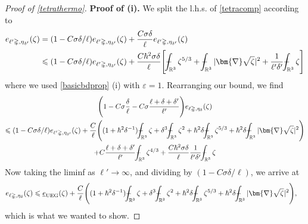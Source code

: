 \documentclass[final,onefignum,onetabnum,reqno]{amsart}
\theoremstyle{remark}
\renewcommand{\le}{\leqslant}
\renewcommand{\epsilon}{\varepsilon}
\newcommand{\ul}[1]{\underline{#1}}
\newcommand{\RR}{\mathbb{R}}
\newcommand{\UEG}{\mathrm{UEG}} %
\newcommand{\grad}{\bm{\nabla}} %
\newcommand{\tetra}{\mathbb{\Delta}} %
\def\Xint#1{\mathchoice
{\XXint\displaystyle\textstyle{#1}}%
{\XXint\textstyle\scriptstyle{#1}}%
{\XXint\scriptstyle\scriptscriptstyle{#1}}%
{\XXint\scriptscriptstyle\scriptscriptstyle{#1}}%
\!\int}
\def\XXint#1#2#3{{\setbox0=\hbox{$#1{#2#3}{\int}$ }
\vcenter{\hbox{$#2#3$ }}\kern-.6\wd0}}
\def\dashint{\Xint-}
\begin{document}
\begin{proof}[Proof of \cref{tetrathermo}]
\noindent\textbf{Proof of (i).}
We split the l.h.s. of \cref{tetracomp} according to 
\begin{align*}
e_{\ell'\tetra,\eta_{\delta'}}(\zeta)&=(1-C\sigma\delta/\ell) e_{\ell'\tetra,\eta_{\delta'}}(\zeta) +  \frac{C\sigma\delta}{\ell} e_{\ell'\tetra,\eta_{\delta'}}(\zeta)\\
&\le (1-C\sigma\delta/\ell) e_{\ell'\tetra,\eta_{\delta'}}(\zeta) + \frac{C\hbar^2\sigma\delta}{\ell} \Bigg[ \dashint_{\RR^3} \zeta^{5/3} + \dashint_{\RR^3} |\grad\sqrt{\zeta}|^2 +  \frac{1}{\ell'\delta'}\dashint_{\RR^3} \zeta \Bigg]
\end{align*}
where we used \cref{basicbdprop} (i) with $\epsilon=1$. Rearranging our bound, we find
\begin{multline*}
\Bigg( 1-C\sigma \frac{\delta}{\ell} -C\sigma\frac{\ell+\delta+\delta'}{\ell'}\Bigg) e_{\ell\tetra,\eta_{\delta}}(\zeta)\\
\le (1-C\sigma\delta/\ell) e_{\ell'\tetra,\eta_{\delta'}}(\zeta)
 +\frac{C}{\ell}\Bigg( (1+\hbar^2\delta^{-1}) \dashint_{\RR^3} \zeta + \delta^3\dashint_{\RR^3} \zeta^2 + \hbar^2\delta \dashint_{\RR^3} \zeta^{5/3} + \hbar^2\delta \dashint_{\RR^3} |\grad\sqrt{\zeta}|^2\Bigg) \\
 + C \frac{\ell+\delta+\delta'}{\ell'} \dashint_{\RR^3} \zeta^{4/3} + \frac{C\hbar^2\sigma\delta}{\ell}  \frac{1}{\ell'\delta'}\dashint_{\RR^3} \zeta
\end{multline*}
Now taking the liminf as $\ell'\to\infty$, and dividing by $(1-C\sigma\delta/\ell)$, we arrive at
\begin{align*}
&e_{\ell\tetra,\eta_{\delta}}(\zeta)\le \ul{e}_\UEG(\zeta) +\frac{C}{\ell}\Bigg( (1+\hbar^2\delta^{-1}) \dashint_{\RR^3} \zeta + \delta^3\dashint_{\RR^3} \zeta^2 + \hbar^2\delta \dashint_{\RR^3} \zeta^{5/3} + \hbar^2\delta \dashint_{\RR^3} |\grad\sqrt{\zeta}|^2\Bigg),
\end{align*}
which is what we wanted to show.


\end{proof}
\end{document}
